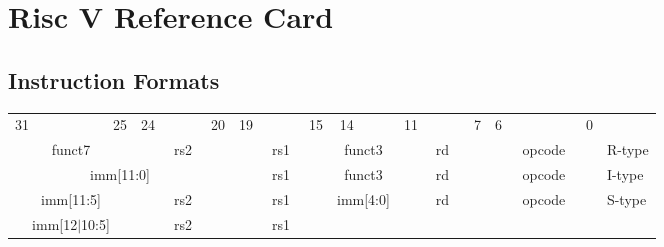 \section*{Risc V Reference Card}

\subsection*{Instruction Formats}

    \begin{tabular} %
    	{p{0.01mm}p{0.01mm}p{0.01mm}p{0.01mm}p{0.01mm}p{0.01mm}p{0.01mm}p{0.01mm}
        p{0.01mm}p{0.01mm}p{0.01mm}p{0.01mm}p{0.01mm}p{0.01mm}p{0.01mm}p{0.01mm}
        p{0.01mm}p{0.01mm}p{0.01mm}p{0.01mm}p{0.01mm}p{0.01mm}p{0.01mm}p{0.01mm}
        p{0.01mm}p{0.01mm}p{0.01mm}p{0.01mm}p{0.01mm}p{0.01mm}p{0.01mm}p{0.01mm}l}
        \multicolumn{1}{c}{31}&&&&&&
        \multicolumn{1}{c}{25}&
        \multicolumn{1}{c}{24}&&&&
        \multicolumn{1}{c}{20}&
        \multicolumn{1}{c}{19}&&&&
        \multicolumn{1}{c}{15}&
        \multicolumn{1}{c}{14}&&&
        \multicolumn{1}{c}{11}&&&&
        \multicolumn{1}{c}{7}&
        \multicolumn{1}{c}{6}&&&&&&
        \multicolumn{1}{c}{0}&
        \\
        \cline{0-31} 
        \multicolumn{7}{|c|}{funct7} &
        \multicolumn{5}{c|}{rs2}&
        \multicolumn{5}{c|}{rs1}&
        \multicolumn{3}{c|}{funct3}&
        \multicolumn{5}{c|}{rd}&
        \multicolumn{7}{c|}{opcode}&
        R-type
        \\
        \cline{0-31} 
        \multicolumn{12}{|c|}{imm[11:0]} &
        \multicolumn{5}{c|}{rs1}&
        \multicolumn{3}{c|}{funct3}&
        \multicolumn{5}{c|}{rd}&
        \multicolumn{7}{c|}{opcode}&
        I-type
        \\
        \cline{0-31} 
        \multicolumn{7}{|c|}{imm[11:5]} &
        \multicolumn{5}{c|}{rs2}&
        \multicolumn{5}{c|}{rs1}&
        \multicolumn{3}{c|}{imm[4:0]}&
        \multicolumn{5}{c|}{rd}&
        \multicolumn{7}{c|}{opcode}&
        S-type
        \\
        \cline{0-31} 
        \multicolumn{7}{|c|}{imm[12$|$10:5]} &
        \multicolumn{5}{c|}{rs2}&
        \multicolumn{5}{c|}{rs1}&

\end{tabular}
